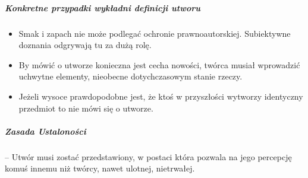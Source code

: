 \message{ !name(owi.tex)}\documentclass{article}
\begin{document}
\subparagraph{Konkretne przypadki wykładni definicji utworu}
\begin{itemize}
  \item Smak i zapach nie może podlegać ochronie prawnoautorskiej. Subiektywne doznania odgrywają tu za dużą rolę.
  \item By mówić o utworze konieczna jest cecha nowości, twórca musiał wprowadzić uchwytne elementy, nieobecne dotychczasowym stanie rzeczy.
  \item Jeżeli wysoce prawdopodobne jest, że ktoś w przyszłości wytworzy identyczny przedmiot to nie mówi się o utworze.
\end{itemize}

\subparagraph{Zasada Ustaloności}
-- Utwór musi zostać przedstawiony, w postaci która pozwala na jego percepcję komuś innemu niż twórcy, nawet ulotnej, nietrwałej.
\end{document}
